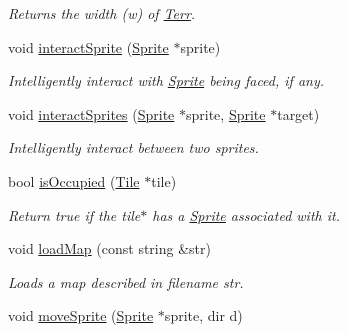\begin{DoxyCompactItemize}
\begin{DoxyCompactList}\small\item\em Returns the width (w) of \hyperlink{class_terr}{Terr}. \end{DoxyCompactList}\item 
void \hyperlink{class_terr_a8e248d8aa2c992345bce55c6ad7d10ff}{interact\+Sprite} (\hyperlink{class_sprite}{Sprite} $\ast$sprite)\hypertarget{class_terr_a8e248d8aa2c992345bce55c6ad7d10ff}{}\label{class_terr_a8e248d8aa2c992345bce55c6ad7d10ff}

\begin{DoxyCompactList}\small\item\em Intelligently interact with \hyperlink{class_sprite}{Sprite} being faced, if any. \end{DoxyCompactList}\item 
void \hyperlink{class_terr_af02d1d579ee4e18f06d6c84f370179d3}{interact\+Sprites} (\hyperlink{class_sprite}{Sprite} $\ast$sprite, \hyperlink{class_sprite}{Sprite} $\ast$target)\hypertarget{class_terr_af02d1d579ee4e18f06d6c84f370179d3}{}\label{class_terr_af02d1d579ee4e18f06d6c84f370179d3}

\begin{DoxyCompactList}\small\item\em Intelligently interact between two sprites. \end{DoxyCompactList}\item 
bool \hyperlink{class_terr_ab207b5e04cea6d9e52592786098d464a}{is\+Occupied} (\hyperlink{class_tile}{Tile} $\ast$tile)\hypertarget{class_terr_ab207b5e04cea6d9e52592786098d464a}{}\label{class_terr_ab207b5e04cea6d9e52592786098d464a}

\begin{DoxyCompactList}\small\item\em Return true if the tile$\ast$ has a \hyperlink{class_sprite}{Sprite} associated with it. \end{DoxyCompactList}\item 
void \hyperlink{class_terr_af53f4fdf0e1605b1536bde8c3fb77c9d}{load\+Map} (const string \&str)\hypertarget{class_terr_af53f4fdf0e1605b1536bde8c3fb77c9d}{}\label{class_terr_af53f4fdf0e1605b1536bde8c3fb77c9d}

\begin{DoxyCompactList}\small\item\em Loads a map described in filename str. \end{DoxyCompactList}\item 
void \hyperlink{class_terr_a1b298d5b387f2db5fe78b877d757591f}{move\+Sprite} (\hyperlink{class_sprite}{Sprite} $\ast$sprite, dir d)\hypertarget{class_terr_a1b298d5b387f2db5fe78b877d757591f}{}\label{class_terr_a1b298d5b387f2db5fe78b877d757591f}


\end{DoxyCompactItemize}
